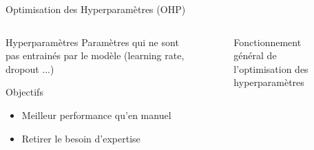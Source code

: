 \begin{frame}{Optimisation des Hyperparamètres (OHP)}
   \begin{columns}
         
       \begin{column}[t]{0.3\textwidth} 
       \begin{block}{Hyperparamètres}
         Paramètres qui ne sont pas entrainés par le modèle (learning rate, dropout ...)           
       \end{block}
       \begin{block}{Objectifs}
        \begin{itemize}
            \item Meilleur performance qu'en manuel
            \item Retirer le besoin d'expertise
        \end{itemize}
        
       \end{block}

       \end{column}
           
       \begin{column}[t]{0.8\textwidth}
        \begin{figure}
            \centering
            
            \caption{Fonctionnement général de l'optimisation des hyperparamètres}
       \end{figure}  
       \end{column}
            
   \end{columns}

   

\end{frame}

